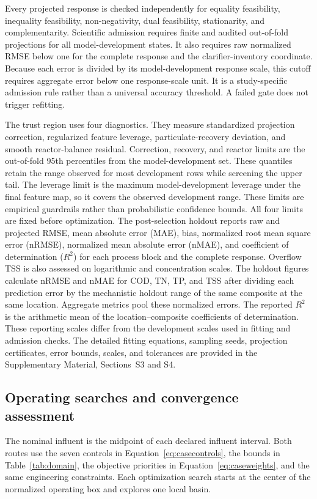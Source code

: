 \documentclass[a4paper,fleqn]{cas-sc}
\begin{document}
Every projected response is checked independently for equality feasibility, inequality feasibility, non-negativity, dual feasibility, stationarity, and complementarity. Scientific admission requires finite and audited out-of-fold projections for all model-development states. It also requires raw normalized RMSE below one for the complete response and the clarifier-inventory coordinate. Because each error is divided by its model-development response scale, this cutoff requires aggregate error below one response-scale unit. It is a study-specific admission rule rather than a universal accuracy threshold. A failed gate does not trigger refitting.

The trust region uses four diagnostics. They measure standardized projection correction, regularized feature leverage, particulate-recovery deviation, and smooth reactor-balance residual. Correction, recovery, and reactor limits are the out-of-fold 95th percentiles from the model-development set. These quantiles retain the range observed for most development rows while screening the upper tail. The leverage limit is the maximum model-development leverage under the final feature map, so it covers the observed development range. These limits are empirical guardrails rather than probabilistic confidence bounds. All four limits are fixed before optimization. The post-selection holdout reports raw and projected RMSE, mean absolute error (MAE), bias, normalized root mean square error (nRMSE), normalized mean absolute error (nMAE), and coefficient of determination ($R^2$) for each process block and the complete response. Overflow TSS is also assessed on logarithmic and concentration scales. The holdout figures calculate nRMSE and nMAE for COD, TN, TP, and TSS after dividing each prediction error by the mechanistic holdout range of the same composite at the same location. Aggregate metrics pool these normalized errors. The reported $R^2$ is the arithmetic mean of the location--composite coefficients of determination. These reporting scales differ from the development scales used in fitting and admission checks. The detailed fitting equations, sampling seeds, projection certificates, error bounds, scales, and tolerances are provided in the Supplementary Material, Sections~S3 and S4.

\subsection{Operating searches and convergence assessment}

The nominal influent is the midpoint of each declared influent interval. Both routes use the seven controls in Equation~\eqref{eq:casecontrols}, the bounds in Table~\ref{tab:domain}, the objective priorities in Equation~\eqref{eq:caseweights}, and the same engineering constraints. Each optimization search starts at the center of the normalized operating box and explores one local basin.
\end{document}

